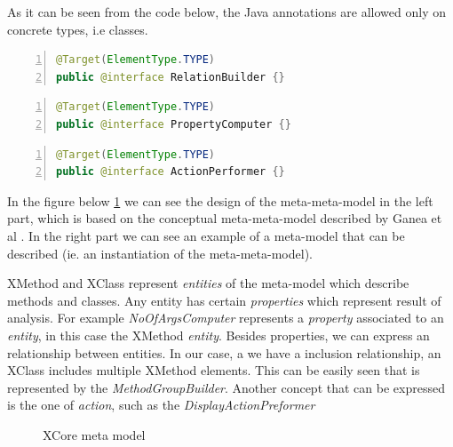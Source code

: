         As it can be seen from the code below, the {J}ava annotations are allowed only on concrete types, i.e classes. 

\small
\begin{lstlisting}[language=Java, numbers=left]
@Target(ElementType.TYPE)
public @interface RelationBuilder {}   
\end{lstlisting}
\normalsize{} \label{codeSection:RelationBuilder}
                          
\small
\begin{lstlisting}[language=Java,numbers=left]
@Target(ElementType.TYPE)
public @interface PropertyComputer {}
\end{lstlisting}
\normalsize{} \label{codeSection:PropertyComputer} 

\small
\begin{lstlisting}[language=Java, numbers=left]
@Target(ElementType.TYPE)
public @interface ActionPerformer {}
\end{lstlisting}
\normalsize{} \label{codeSection:ActionPerformer} 


        In the figure below \ref{fig:XMetaModel} we can see the design of the meta-meta-model in the left part, which is based on the conceptual meta-meta-model described
by Ganea et al \cite{paper:ganea}. In the right part we can see an example of a meta-model that can be described (ie. an instantiation of the meta-meta-model). 

        XMethod and XClass represent \textit{entities} of the meta-model which describe methods and classes. Any entity has certain \textit{properties} which represent
result of analysis. For example \textit{NoOfArgsComputer} represents a \textit{property } associated to an \textit{entity}, in this case the XMethod \textit{entity}.
Besides properties, we can express an relationship between entities. In our case, a we have a inclusion relationship, an XClass includes multiple XMethod elements. This can
be easily seen that is represented by the \textit{MethodGroupBuilder}. Another concept that can be expressed is the one of \textit{action}, such as the \textit{DisplayActionPreformer}


        \begin{figure}
        \centering
        \caption{XCore meta model \cite{paper:xcore}}
        \label{fig:XMetaModel}
        \end{figure}

